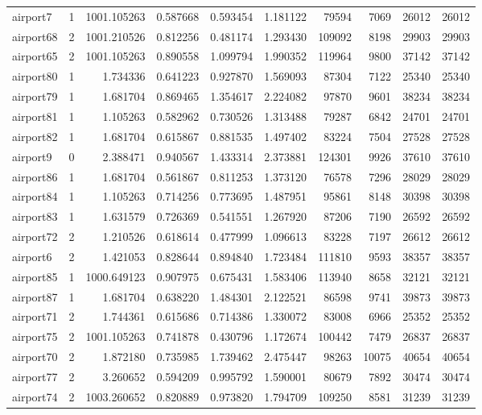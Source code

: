 \documentclass[../../../thesis.tex]{subfiles}
\begin{document}
\begin{longtable}{|l|r|r|r|r|r|r|r|r|r|}
airport7 & 1 & 1001.105263 & 0.587668 & 0.593454 & 1.181122 & 79594 & 7069 & 26012 & 26012 \\
airport68 & 2 & 1001.210526 & 0.812256 & 0.481174 & 1.293430 & 109092 & 8198 & 29903 & 29903 \\
airport65 & 2 & 1001.105263 & 0.890558 & 1.099794 & 1.990352 & 119964 & 9800 & 37142 & 37142 \\
airport80 & 1 & 1.734336 & 0.641223 & 0.927870 & 1.569093 & 87304 & 7122 & 25340 & 25340 \\
airport79 & 1 & 1.681704 & 0.869465 & 1.354617 & 2.224082 & 97870 & 9601 & 38234 & 38234 \\
airport81 & 1 & 1.105263 & 0.582962 & 0.730526 & 1.313488 & 79287 & 6842 & 24701 & 24701 \\
airport82 & 1 & 1.681704 & 0.615867 & 0.881535 & 1.497402 & 83224 & 7504 & 27528 & 27528 \\
airport9 & 0 & 2.388471 & 0.940567 & 1.433314 & 2.373881 & 124301 & 9926 & 37610 & 37610 \\
airport86 & 1 & 1.681704 & 0.561867 & 0.811253 & 1.373120 & 76578 & 7296 & 28029 & 28029 \\
airport84 & 1 & 1.105263 & 0.714256 & 0.773695 & 1.487951 & 95861 & 8148 & 30398 & 30398 \\
airport83 & 1 & 1.631579 & 0.726369 & 0.541551 & 1.267920 & 87206 & 7190 & 26592 & 26592 \\
airport72 & 2 & 1.210526 & 0.618614 & 0.477999 & 1.096613 & 83228 & 7197 & 26612 & 26612 \\
airport6 & 2 & 1.421053 & 0.828644 & 0.894840 & 1.723484 & 111810 & 9593 & 38357 & 38357 \\
airport85 & 1 & 1000.649123 & 0.907975 & 0.675431 & 1.583406 & 113940 & 8658 & 32121 & 32121 \\
airport87 & 1 & 1.681704 & 0.638220 & 1.484301 & 2.122521 & 86598 & 9741 & 39873 & 39873 \\
airport71 & 2 & 1.744361 & 0.615686 & 0.714386 & 1.330072 & 83008 & 6966 & 25352 & 25352 \\
airport75 & 2 & 1001.105263 & 0.741878 & 0.430796 & 1.172674 & 100442 & 7479 & 26837 & 26837 \\
airport70 & 2 & 1.872180 & 0.735985 & 1.739462 & 2.475447 & 98263 & 10075 & 40654 & 40654 \\
airport77 & 2 & 3.260652 & 0.594209 & 0.995792 & 1.590001 & 80679 & 7892 & 30474 & 30474 \\
airport74 & 2 & 1003.260652 & 0.820889 & 0.973820 & 1.794709 & 109250 & 8581 & 31239 & 31239 \\

\end{longtable}
\end{document}
